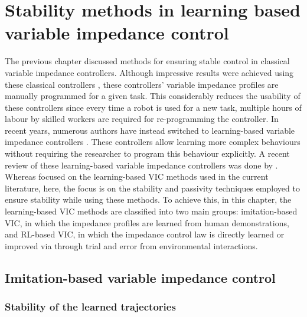 \chapter{Stability methods in learning based variable impedance control}
\label{chapter:learning_based_variable_impedance}

The previous chapter discussed methods for ensuring stable control in classical variable impedance controllers. Although impressive results were achieved using these classical controllers \cite{songTutorialSurveyComparison2019}, these controllers' variable impedance profiles are manually programmed for a given task. This considerably reduces the usability of these controllers since every time a robot is used for a new task, multiple hours of labour by skilled workers are required for re-programming the controller. In recent years, numerous authors have instead switched to learning-based variable impedance controllers \cite{abu-dakkaVariableImpedanceControl2020}. These controllers allow learning more complex behaviours without requiring the researcher to program this behaviour explicitly. A recent review of these learning-based variable impedance controllers was done by \cite{abu-dakkaVariableImpedanceControl2020}. Whereas \cite{abu-dakkaVariableImpedanceControl2020} focused on the learning-based VIC methods used in the current literature, here, the focus is on the stability and passivity techniques employed to ensure stability while using these methods. To achieve this, in this chapter, the learning-based VIC methods are classified into two main groups: imitation-based VIC, in which the impedance profiles are learned from human demonstrations, and RL-based VIC, in which the impedance control law is directly learned or improved via through trial and error from environmental interactions.

\section{Imitation-based variable impedance control}
\subsection{Stability of the learned trajectories}

